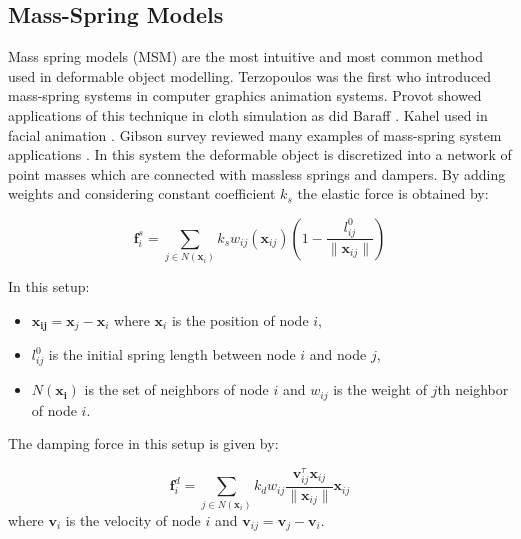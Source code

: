 \subsection{Mass-Spring Models}
Mass spring models (MSM) are the most intuitive and most common method used in deformable object modelling.
Terzopoulos \etal \cite{terzopoulos1988modeling} was the first who introduced mass-spring systems in 
computer graphics animation systems. Provot \etal showed applications of this technique in cloth 
simulation \cite{provot1995deformation} as did Baraff \etal \cite{baraff1998large}. Kahel \etal used in 
facial animation \cite{kahler2001geometry}. Gibson \etal survey reviewed many examples of mass-spring 
system applications \cite{Gibson1997a}. In this system the deformable object is discretized into a network 
of point masses which are connected with massless springs and dampers. By adding weights and considering
constant coefficient $k_s$ the elastic force is obtained by:

\begin{equation}
 \boldsymbol{f}^s_i = \sum_{j \in N(\boldsymbol{x}_i)} k_s w_{ij}(\boldsymbol{x}_{ij})(1-\frac{l^0_{ij}}{\| \boldsymbol{x}_{ij} \|})
\end{equation}

In this setup:

\begin{itemize}
 \item $\boldsymbol{x_{ij}} = \boldsymbol{x}_j - \boldsymbol{x}_i$ where $\boldsymbol{x}_i$ is the position of node $i$, 
 \item $l^0_{ij}$ is the initial spring length between node $i$ and node $j$,
 \item $N(\boldsymbol{x_i})$ is the set of neighbors of node $i$ and $w_{ij}$ is the weight of $j$th neighbor of node $i$.
\end{itemize}

The damping force in this setup is given by:

\begin{equation}
 \boldsymbol{f}^d_i = \sum_{j \in N(\boldsymbol{x}_i)} k_d w_{ij} \frac{\boldsymbol{v}^\tau_{ij} \boldsymbol{x}_{ij} }{\|\boldsymbol{x}_{ij} \|} \boldsymbol{x}_{ij}
\end{equation}
where $\boldsymbol{v}_i$ is the velocity of node $i$ and $\boldsymbol{v}_{ij} = \boldsymbol{v}_j - \boldsymbol{v}_i$.


